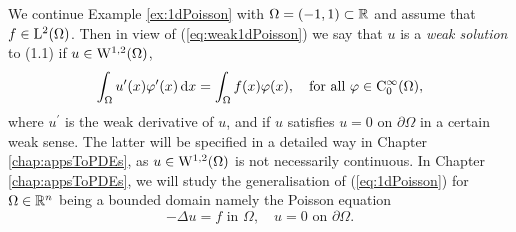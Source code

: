 \begin{ex}
  We continue Example \ref{ex:1dPoisson} with $\Omega = (-1,1) \subset \mathbb{R}$ and assume that $f \in \mathrm{L}^2(\Omega)$.
  Then in view of (\ref{eq:weak1dPoisson}) we say that $u$ is a \emph{weak solution} to (1.1) if $u \in \mathrm{W}^{1,2}(\Omega)$,
  $$
  \int_\Omega u^\prime(x) \varphi^\prime(x) \, {\operatorname{d}\!{x}} = \int_\Omega f(x) \varphi(x), \quad \text{for all } \varphi \in \mathrm{C}_0^\infty(\Omega),
  $$
  where $u^\prime$ is the weak derivative of $u$, and if $u$ satisfies $u = 0$ on $\partial \Omega$ in a certain weak sense.
  The latter will be specified in a detailed way in Chapter \ref{chap:appsToPDEs}, as $u \in \mathrm{W}^{1,2}(\Omega)$ is not necessarily continuous.
  In Chapter \ref{chap:appsToPDEs}, we will study the generalisation of (\ref{eq:1dPoisson}) for $\Omega \in \mathbb{R}^n$ being a bounded domain namely the Poisson equation
  $$
  -\Delta u = f \text{ in } \Omega, \quad u = 0 \text{ on } \partial \Omega.
  $$
\end{ex}
